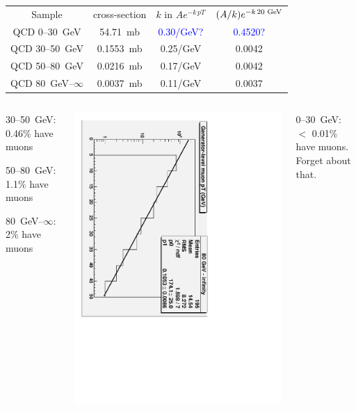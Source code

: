 \documentclass[compress]{beamer}
\begin{document}
\begin{frame}
\begin{center}
\begin{tabular}{c c c c}
Sample & cross-section & $k$ in $Ae^{-k \, pT}$ & $(A/k)e^{-k \, 20\mbox{\scriptsize\ GeV}}$ \\
QCD 0--30~GeV & 54.71~mb & \textcolor{blue}{0.30/GeV?} & \textcolor{blue}{0.4520?} \\
QCD 30--50~GeV & 0.1553~mb & 0.25/GeV & 0.0042 \\
QCD 50--80~GeV & 0.0216~mb & 0.17/GeV & 0.0042 \\
QCD 80~GeV--$\infty$ & 0.0037~mb & 0.11/GeV & 0.0037 \\
\end{tabular}
\end{center}

\begin{columns}
\begin{center}
30--50~GeV: 0.46\% have muons

50--80~GeV: 1.1\% have muons

80~GeV--$\infty$: 2\% have muons
\end{center}
\includegraphics[height=\linewidth, angle=90]{exponential_qcd2.pdf}

0--30~GeV: $<$ 0.01\% have muons. \\ Forget about that.


\end{columns}
\end{frame}
\end{document}
